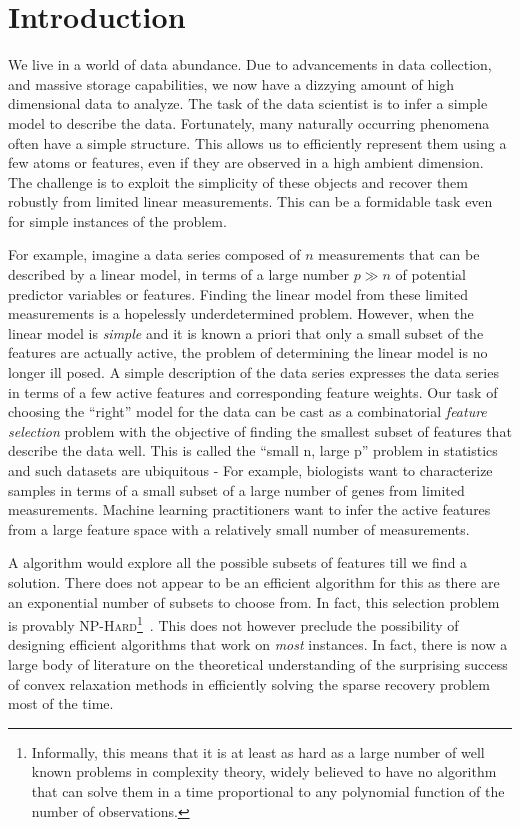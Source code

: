 \chapter{Introduction}

We live in a world of data abundance. Due to advancements in data collection,
and massive storage capabilities, we now have a dizzying amount of high
dimensional data to analyze. The task of the data scientist is to infer a simple
model to describe the data. Fortunately, many naturally occurring phenomena
often have a simple structure. This allows us to efficiently represent them
using a few atoms or features, even if they are observed in a high ambient
dimension. The challenge is to exploit the simplicity of these objects and
recover them robustly from limited linear measurements. This can be a formidable
task even for simple instances of the problem.

For example, imagine a data series composed of $n$ measurements that can be
described by a linear model, in terms of a large number $p \gg n$ of potential
predictor variables or features. Finding the linear model from these limited
measurements is a hopelessly underdetermined problem. However, when the linear
model is \emph{simple} and it is known a priori that only a small subset of the
features are actually active, the problem of determining the linear model is no
longer ill posed. A simple description of the data series expresses the data
series in terms of a few active features and corresponding feature weights. Our
task of choosing the ``right'' model for the data can be cast as a combinatorial
\emph{feature selection} problem with the objective of finding the smallest
subset of features that describe the data well. This is called the ``small n,
large p'' problem in statistics and such datasets are ubiquitous - For example,
biologists want to characterize samples in terms of a small subset of a large
number of genes from limited measurements. Machine learning practitioners want
to infer the active features from a large feature space with a relatively small
number of measurements.

A \naive{} algorithm would explore all the possible subsets of features till we
find a solution. There does not appear to be an efficient algorithm for this as
there are an exponential number of subsets to choose from. In fact, this
selection problem is provably \textsc{NP-Hard}\footnote{Informally, this means
that it is at least as hard as a large number of well known problems in
complexity theory, widely believed to have no algorithm that can solve them in a
time proportional to any polynomial function of the number of
observations.}~\cite{Natarajan95}. This does not however preclude the
possibility of designing efficient algorithms that work on \emph{most}
instances. In fact, there is now a large body of literature on the theoretical
understanding of the surprising success of convex relaxation methods in
efficiently solving the sparse recovery problem most of the time.

